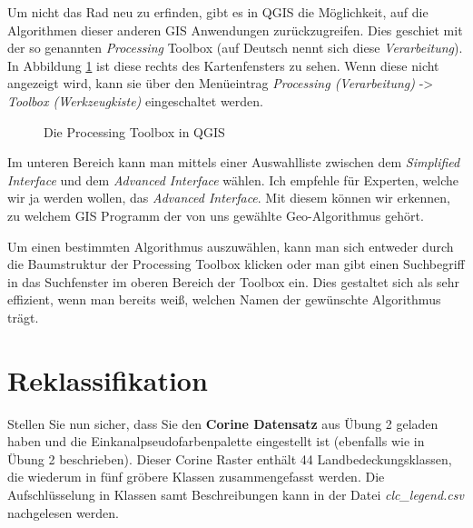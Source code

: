 \documentclass[a4paper,12pt,ngerman]{sphinxmanual}
\begin{document}
Um nicht das Rad neu zu erfinden, gibt es in QGIS die Möglichkeit, auf die Algorithmen dieser anderen GIS Anwendungen zurückzugreifen. Dies geschiet mit der so genannten \emph{Processing} Toolbox (auf Deutsch nennt sich diese \emph{Verarbeitung}). In Abbildung \hyperref[uebung3:figprocessing]{ \ref*{uebung3:figprocessing}} ist diese rechts des Kartenfensters zu sehen. Wenn diese nicht angezeigt wird, kann sie über den Menüeintrag \emph{Processing (Verarbeitung)} -\textgreater{} \emph{Toolbox (Werkzeugkiste)} eingeschaltet werden.
\begin{figure}[htbp]
\centering
\capstart

\caption{Die Processing Toolbox in QGIS}\label{uebung3:figprocessing}\end{figure}

Im unteren Bereich kann man mittels einer Auswahlliste zwischen dem \emph{Simplified Interface} und dem \emph{Advanced Interface} wählen. Ich empfehle für Experten, welche wir ja werden wollen, das \emph{Advanced Interface}. Mit diesem können wir erkennen, zu welchem GIS Programm der von uns gewählte Geo-Algorithmus gehört.

Um einen bestimmten Algorithmus auszuwählen, kann man sich entweder durch die Baumstruktur der Processing Toolbox klicken oder man gibt einen Suchbegriff in das Suchfenster im oberen Bereich der Toolbox ein. Dies gestaltet sich als sehr effizient, wenn man bereits weiß, welchen Namen der gewünschte Algorithmus trägt.


\section{Reklassifikation}
\label{uebung3:reklassifikation}
Stellen Sie nun sicher, dass Sie den \textbf{Corine Datensatz} aus Übung 2 geladen haben und die Einkanalpseudofarbenpalette eingestellt ist (ebenfalls wie in Übung 2 beschrieben).
Dieser Corine Raster enthält 44 Landbedeckungsklassen, die wiederum in fünf gröbere Klassen zusammengefasst werden. Die Aufschlüsselung in Klassen samt Beschreibungen kann in der Datei \emph{clc\_legend.csv} nachgelesen werden.
\end{document}
